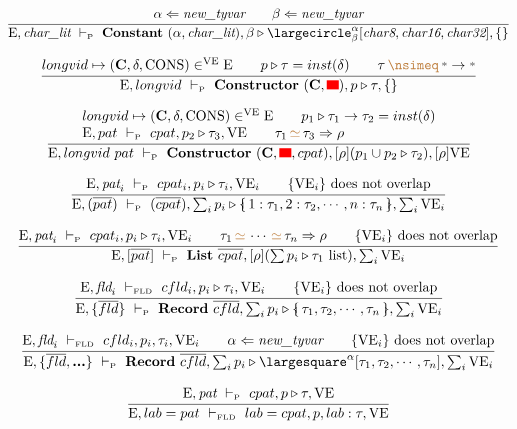 \documentclass[11pt,a4paper]{article}
\newcommand{\key}[1]{\textrm{\textbf{#1}}}
\newcommand{\prodlhs}[1]{\textit{#1}}
\newcommand{\record}[1]{\{\!\!\shortmid #1 \shortmid\!\!\}}
\newcommand{\overld}[3]{\largecircle^{#1}_{#2}{#3}}
\newcommand{\irecrd}[2]{\largesquare^{#1}{#2}}
\newcommand{\qualtype}[2]{#1 \triangleright #2}
\newcommand{\unify}[3]{#1\,{\color{brown}{\simeq}}\,#2 \Rightarrow #3}
\newcommand{\unifylist}[3]{#1\,{\color{brown}{\simeq}}\,\cdots\,{\color{brown}{\simeq}}\,#2 \Rightarrow #3}
\newcommand{\notunifiable}[2]{#1\,{\color{brown}{\nsimeq}}\,#2}
\newcommand{\braced}[1]{\{#1\}}
\newcommand{\wildcard}{{\color{gray}\scriptstyle\textbf{*}}}
\newcommand{\litchar}{\textit{char\_lit}}
\newcommand{\Char}[1]{\textit{char#1}}
\newcommand{\Env}  {\textrm{E}}
\newcommand{\VE}   {\textrm{VE}}
\newcommand{\VKC}  {\textrm{CONS}}
\newcommand{\vcon} {\mathbf{C}}
\newcommand{\Empty}{\braced{}}
\newcommand{\vdashP}  {\ \vdash_{\textrm{\tiny P}}\  }
\newcommand{\vdashFLD}{\ \vdash_\textrm{\tiny FLD}\  }
\newcommand{\corenew}[1]{\textit{new\_#1}}
\newcommand{\vect}[1]{\overline{#1}}
\newcommand{\TODO}{{\color{red}\rule{2ex}{1.5ex}}}
\begin{document}
\[
\cfrac
 {\alpha \Leftarrow \corenew{tyvar} \qquad
  \beta  \Leftarrow \corenew{tyvar}}
 {\Env, \litchar \vdashP 
    \key{Constant}\ (\alpha,\litchar), \qualtype{\beta}{\overld{\alpha}{\beta}{[\Char{8},\Char{16},\Char{32}]}}, \Empty}
\]

\[
\cfrac
 {longvid \mapsto (\vcon, \delta, \VKC) \in^\VE \Env \qquad
  \qualtype{p}{\tau} = inst(\delta)    \qquad
  \notunifiable{\tau}{\wildcard \to \wildcard} }
 {\Env, longvid \vdashP \key{Constructor}\ (\vcon, \TODO), \qualtype{p}{\tau}, \Empty}
\]

\[
\cfrac
 {\begin{array}{l}
  longvid \mapsto (\vcon, \delta, \VKC) \in^\VE \Env     \qquad
  \qualtype{p_1}{\tau_1\to\tau_2} = inst(\delta)         \\
  \Env,pat \vdashP cpat, \qualtype{p_2}{\tau_3},\VE      \qquad
  \unify{\tau_1}{\tau_3}{\rho}                           \\
  \end{array}}
 {\Env, longvid\ pat \vdashP \key{Constructor}\ (\vcon, \TODO, cpat), [\rho](\qualtype{p_1 \cup p_2}{\tau_2}), [\rho]\VE}
\]

\[
\cfrac
 {\Env,\prodlhs{pat}_i \vdashP cpat_i,\qualtype{p_i}{\tau_i},\VE_i \qquad
  \braced{\VE_i}\ \textrm{does not overlap}}
 {\Env, (\vect{pat}) \vdashP
  (\vect{cpat}), \qualtype{\sum_i p_i}{\record{1:\tau_1,2:\tau_2,\cdots,n:\tau_n}}, \sum_i\VE_i}
\]

\[
\cfrac
 {\Env,\prodlhs{pat}_i \vdashP cpat_i,\qualtype{p_i}{\tau_i},\VE_i  \qquad
  \unifylist{\tau_1}{\tau_n}{\rho}                                  \qquad
  \braced{\VE_i}\ \textrm{does not overlap}}
 {\Env, [\vect{pat}] \vdashP
    \key{List}\ \vect{cpat}, [\rho](\qualtype{\sum p_i}{\tau_1\ \textrm{list}}), \sum_i\VE_i}
\]

\[
\cfrac
 {\Env,\prodlhs{fld}_i \vdashFLD cfld_i,\qualtype{p_i}{\tau_i},\VE_i \qquad
  \braced{\VE_i}\ \textrm{does not overlap}}
 {\Env, \braced{\vect{fld}} \vdashP
    \key{Record}\ \vect{cfld}, \qualtype{\sum_i p_i}{\record{\tau_1,\tau_2,\cdots,\tau_n}}, \sum_i\VE_i}
\]

\[
\cfrac
 {\Env,\prodlhs{fld}_i \vdashFLD cfld_i,p_i,\tau_i,\VE_i \qquad
  \alpha \Leftarrow \corenew{tyvar}                      \qquad
  \braced{\VE_i}\ \textrm{does not overlap}}
 {\Env, \braced{\vect{fld},\key{...}} \vdashP
    \key{Record}\ \vect{cfld}, \qualtype{\sum_i p_i}{\irecrd{\alpha}{[\tau_1,\tau_2,\cdots,\tau_n]}}, \sum_i\VE_i}
\]

\[
\cfrac
 {\Env,\prodlhs{pat} \vdashP cpat, \qualtype{p}{\tau}, \VE}
 {\Env, lab = pat \vdashFLD lab=cpat, p, lab:\tau, \VE }
\]
\end{document}
